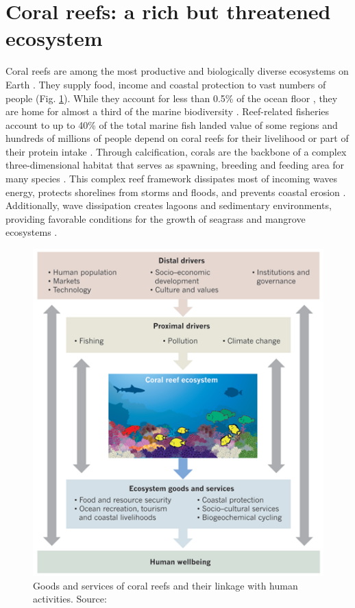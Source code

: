 \section{Coral reefs: a rich but threatened ecosystem}

Coral reefs are among the most productive and biologically diverse ecosystems on Earth \citep{connell1978diversity, moberg1999ecological}. They supply food, income and coastal protection to vast numbers of people (Fig. \ref{intro:corals}). While they account for less than 0.5\% of the ocean floor \citep{spalding1997new}, they are home for almost a third of the marine biodiversity \citep{moberg1999ecological}. Reef-related fisheries account to up to 40\% of the total marine
fish landed value of some regions \citep{teh2013global} and hundreds of millions of people depend on coral reefs for their livelihood or part of their protein intake \citep{salvat1992coral,hoegh2019people}. Through calcification, corals are the backbone of a complex three-dimensional habitat that serves as spawning, breeding and feeding area for many species \citep{moberg1999ecological,rogers2014vulnerability}. This complex reef framework  dissipates most of incoming waves energy, protects shorelines from storms and floods, and prevents coastal erosion \citep{ferrario2014effectiveness,elliff2017coral}. Additionally, wave dissipation creates lagoons and sedimentary environments, providing favorable conditions for the growth of seagrass and mangrove ecosystems \citep{moberg1999ecological,guannel2016power}.

\begin{figure}
    \centering
    \includegraphics[width=.8\textwidth]{chapters/intro/figures/anthropocene.png}
    \caption{Goods and services of coral reefs and their linkage with human activities.  Source: \cite{hughes2017coral}}
    \label{intro:corals}
\end{figure}

